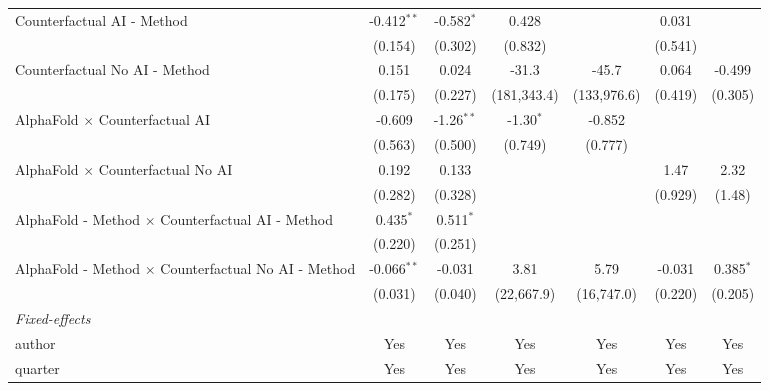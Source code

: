 \begin{tabular}{lcccccc}
   Counterfactual AI - Method                                 & -0.412$^{**}$ & -0.582$^{*}$ & 0.428       &             & 0.031   &   \\   
                                                              & (0.154)       & (0.302)      & (0.832)     &             & (0.541) &   \\   
   Counterfactual No AI - Method                              & 0.151         & 0.024        & -31.3       & -45.7       & 0.064   & -0.499\\   
                                                              & (0.175)       & (0.227)      & (181,343.4) & (133,976.6) & (0.419) & (0.305)\\   
   AlphaFold $\times$ Counterfactual AI                       & -0.609        & -1.26$^{**}$ & -1.30$^{*}$ & -0.852      &         &   \\   
                                                              & (0.563)       & (0.500)      & (0.749)     & (0.777)     &         &   \\   
   AlphaFold $\times$ Counterfactual No AI                    & 0.192         & 0.133        &             &             & 1.47    & 2.32\\   
                                                              & (0.282)       & (0.328)      &             &             & (0.929) & (1.48)\\   
   AlphaFold - Method $\times$ Counterfactual AI - Method     & 0.435$^{*}$   & 0.511$^{*}$  &             &             &         &   \\   
                                                              & (0.220)       & (0.251)      &             &             &         &   \\   
   AlphaFold - Method $\times$ Counterfactual No AI - Method  & -0.066$^{**}$ & -0.031       & 3.81        & 5.79        & -0.031  & 0.385$^{*}$\\   
                                                              & (0.031)       & (0.040)      & (22,667.9)  & (16,747.0)  & (0.220) & (0.205)\\   
   \midrule
   \emph{Fixed-effects}\\
   author                                                     & Yes           & Yes          & Yes         & Yes         & Yes     & Yes\\  
   quarter                                                    & Yes           & Yes          & Yes         & Yes         & Yes     & Yes\\  

\end{tabular}
